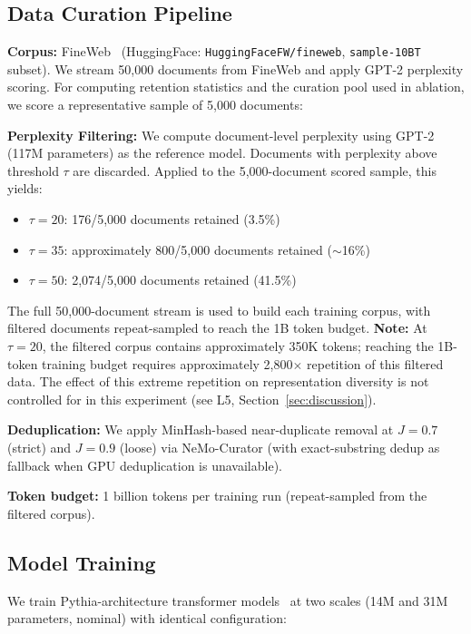 \subsection{Data Curation Pipeline}

\textbf{Corpus:} FineWeb~\cite{Penedo2025FineWeb2} (HuggingFace: \texttt{HuggingFaceFW/fineweb}, \texttt{sample-10BT} subset). We stream 50,000 documents from FineWeb and apply GPT-2 perplexity scoring. For computing retention statistics and the curation pool used in ablation, we score a representative sample of 5,000 documents:

\textbf{Perplexity Filtering:} We compute document-level perplexity using GPT-2 (117M parameters) as the reference model. Documents with perplexity above threshold $\tau$ are discarded. Applied to the 5,000-document scored sample, this yields:

\begin{itemize}
\item $\tau{=}20$: 176/5,000 documents retained (3.5\%)
\item $\tau{=}35$: approximately 800/5,000 documents retained ($\sim$16\%)
\item $\tau{=}50$: 2,074/5,000 documents retained (41.5\%)
\end{itemize}

The full 50,000-document stream is used to build each training corpus, with filtered documents repeat-sampled to reach the 1B token budget. \textbf{Note:} At $\tau{=}20$, the filtered corpus contains approximately 350K tokens; reaching the 1B-token training budget requires approximately 2,800$\times$ repetition of this filtered data. The effect of this extreme repetition on representation diversity is not controlled for in this experiment (see L5, Section~\ref{sec:discussion}).

\textbf{Deduplication:} We apply MinHash-based near-duplicate removal at $J{=}0.7$ (strict) and $J{=}0.9$ (loose) via NeMo-Curator (with exact-substring dedup as fallback when GPU deduplication is unavailable).

\textbf{Token budget:} 1 billion tokens per training run (repeat-sampled from the filtered corpus).

\subsection{Model Training}

We train Pythia-architecture transformer models~\cite{Biderman2023Pythia} at two scales (14M and 31M parameters, nominal) with identical configuration:

